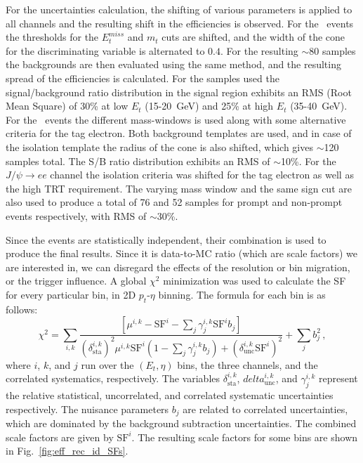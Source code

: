 For the uncertainties calculation, the shifting of various parameters is applied to all channels and the resulting shift in the efficiencies is observed. For the \Wenu\ events the thresholds for the $E_{t}^{miss}$ and $m_{t}$ cuts are shifted, and the width of the cone for the discriminating variable is alternated to $0.4$. For the resulting $\sim$80 samples the backgrounds are then evaluated using the same method, and the resulting spread of the efficiencies is calculated. For the samples used the signal/background ratio distribution in the signal region exhibits an RMS (Root Mean Square) of 30\% at low $E_{t}$ (15-20~GeV) and 25\% at high $E_{t}$ (35-40~GeV). For the \Zee\ events the different mass-windows is used along with some alternative criteria for the tag electron. Both background templates are used, and in case of the isolation template the radius of the cone is also shifted, which gives $\sim$120 samples total. The S/B ratio distribution exhibits an RMS of $\sim$10\%. For the $J/\psi \to ee$ channel the isolation criteria was shifted for the tag electron as well as the high TRT requirement. The varying mass window and the same sign cut are also used to produce a total of 76 and 52 samples for prompt and non-prompt events respectively, with RMS of $\sim$30\%.

Since the events are statistically independent, their combination is used to produce the final results. Since it is data-to-MC ratio (which are scale factors) we are interested in, we can disregard the effects of the resolution or bin migration, or the trigger influence. A global $\chi^{2}$ minimization was used to calculate the SF for every particular bin, in 2D $p_{t}$-$\eta$ binning. The formula for each bin is as follows:
\begin{equation}
\chi^{2} = \sum_{i,k} \frac{\left[ \mu^{i,k} - \mathrm{SF}^{i} - \sum_{j} \gamma_{j}^{i,k}\mathrm{SF}^{i}b_{j} \right]}
  {\left( \delta^{i,k}_{\mathrm{sta}} \right)^{2} \mu^{i,k}\mathrm{SF}^{i} \left( 1 - \sum_{j} \gamma_{j}^{i,k}b_{j} \right) + \left(\delta^{i,k}_{\mathrm{unc}} \mathrm{SF}^{i} \right)^{2}}
  + \sum_{j} b_{j}^{2} \,,
\end{equation}
where $i$, $k$, and $j$ run  over  the  $(E_{t}, \eta)$ bins, the three channels, and the correlated systematics, respectively. The variables $\delta^{i,k}_{\mathrm{sta}}$, $delta^{i,k}_{\mathrm{unc}}$, and $\gamma_{j}^{i,k}$ represent the relative statistical, uncorrelated, and correlated systematic uncertainties respectively. The nuisance parameters $b_{j}$ are  related  to  correlated  uncertainties,  which are  dominated  by  the  background subtraction uncertainties. The combined scale factors are given by $\mathrm{SF}^{i}$. The resulting scale factors for some bins are shown in Fig.~\ref{fig:eff_rec_id_SFs}.

